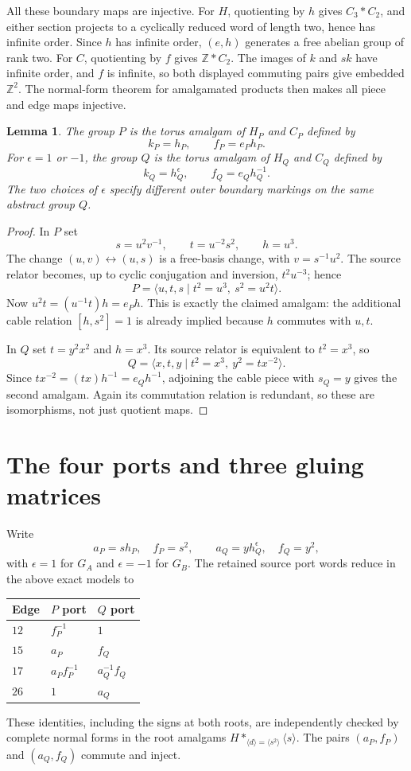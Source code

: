 \documentclass[11pt]{article}
\newtheorem{lemma}[theorem]{Lemma}
\begin{document}
All these boundary maps are injective. For $H$, quotienting by $h$
gives $C_3*C_2$, and either section projects to a cyclically reduced
word of length two, hence has infinite order. Since $h$ has infinite
order, $(e,h)$ generates a free abelian group of rank two. For $C$,
quotienting by $f$ gives $\mathbb Z*C_2$. The images of $k$ and $sk$
have infinite order, and $f$ is infinite, so both displayed commuting
pairs give embedded $\mathbb Z^2$. The normal-form theorem for
amalgamated products then makes all piece and edge maps injective.

\begin{lemma}\label{lem:models}
The group $P$ is the torus amalgam of $H_P$ and $C_P$ defined by
\[
 k_P=h_P,\qquad f_P=e_P h_P.
\]
For $\epsilon=1$ or $-1$, the group $Q$ is the torus amalgam of $H_Q$
and $C_Q$ defined by
\[
 k_Q=h_Q^\epsilon,\qquad f_Q=e_Qh_Q^{-1}.
\]
The two choices of $\epsilon$ specify different outer boundary markings
on the same abstract group $Q$.
\end{lemma}
\begin{proof}
In $P$ set
\[
 s=u^2v^{-1},\qquad t=u^{-2}s^2,\qquad h=u^3.
\]
The change $(u,v)\leftrightarrow(u,s)$ is a free-basis change, with
$v=s^{-1}u^2$. The source relator becomes, up to cyclic conjugation
and inversion, $t^2u^{-3}$; hence
\[
 P=\langle u,t,s\mid t^2=u^3,\ s^2=u^2t\rangle.
\]
Now $u^2t=(u^{-1}t)h=e_Ph$. This is exactly the claimed amalgam:
the additional cable relation $[h,s^2]=1$ is already implied because
$h$ commutes with $u,t$.

In $Q$ set $t=y^2x^2$ and $h=x^3$. Its source relator is equivalent
to $t^2=x^3$, so
\[
 Q=\langle x,t,y\mid t^2=x^3,\ y^2=tx^{-2}\rangle.
\]
Since $tx^{-2}=(tx)h^{-1}=e_Qh^{-1}$, adjoining the cable piece with
$s_Q=y$ gives the second amalgam. Again its commutation relation is
redundant, so these are isomorphisms, not just quotient maps.
\end{proof}

\section{The four ports and three gluing matrices}

Write
\[
 a_P=s h_P,\quad f_P=s^2,\qquad
 a_Q=y h_Q^\epsilon,\quad f_Q=y^2,
\]
with $\epsilon=1$ for $G_A$ and $\epsilon=-1$ for $G_B$.
The retained source port words reduce in the above exact models to
\begin{center}
\begin{tabular}{lll}
\toprule
Edge & $P$ port & $Q$ port\\
\midrule
$12$ & $f_P^{-1}$ & $1$\\
$15$ & $a_P$ & $f_Q$\\
$17$ & $a_P f_P^{-1}$ & $a_Q^{-1}f_Q$\\
$26$ & $1$ & $a_Q$\\
\bottomrule
\end{tabular}
\end{center}
These identities, including the signs at both roots, are independently
checked by complete normal forms in the root amalgams
$H*_{\langle d\rangle=\langle s^2\rangle}\langle s\rangle$.
The pairs $(a_P,f_P)$ and $(a_Q,f_Q)$ commute and inject.
\end{document}
